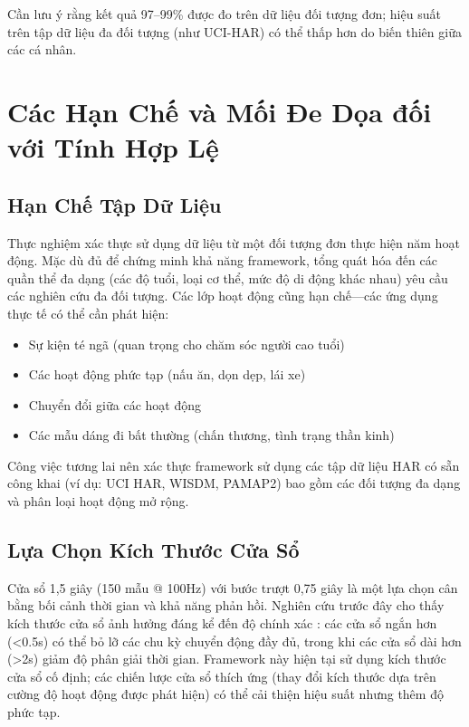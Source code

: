 Cần lưu ý rằng kết quả 97--99\% được đo trên dữ liệu đối tượng đơn; hiệu suất trên tập dữ liệu đa đối tượng (như UCI-HAR) có thể thấp hơn do biến thiên giữa các cá nhân.

\section{Các Hạn Chế và Mối Đe Dọa đối với Tính Hợp Lệ}

\subsection{Hạn Chế Tập Dữ Liệu}
Thực nghiệm xác thực sử dụng dữ liệu từ một đối tượng đơn thực hiện năm hoạt động. Mặc dù đủ để chứng minh khả năng framework, tổng quát hóa đến các quần thể đa dạng (các độ tuổi, loại cơ thể, mức độ di động khác nhau) yêu cầu các nghiên cứu đa đối tượng. Các lớp hoạt động cũng hạn chế—các ứng dụng thực tế có thể cần phát hiện:
\begin{itemize}
    \item Sự kiện té ngã (quan trọng cho chăm sóc người cao tuổi)
    \item Các hoạt động phức tạp (nấu ăn, dọn dẹp, lái xe)
    \item Chuyển đổi giữa các hoạt động
    \item Các mẫu dáng đi bất thường (chấn thương, tình trạng thần kinh)
\end{itemize}

Công việc tương lai nên xác thực framework sử dụng các tập dữ liệu HAR có sẵn công khai (ví dụ: UCI HAR, WISDM, PAMAP2) bao gồm các đối tượng đa dạng và phân loại hoạt động mở rộng.

\subsection{Lựa Chọn Kích Thước Cửa Sổ}
Cửa sổ 1,5 giây (150 mẫu @ 100Hz) với bước trượt 0,75 giây là một lựa chọn cân bằng bối cảnh thời gian và khả năng phản hồi. Nghiên cứu trước đây cho thấy kích thước cửa sổ ảnh hưởng đáng kể đến độ chính xác \cite{banos2014wisdm}: các cửa sổ ngắn hơn (<0.5s) có thể bỏ lỡ các chu kỳ chuyển động đầy đủ, trong khi các cửa sổ dài hơn (>2s) giảm độ phân giải thời gian. Framework này hiện tại sử dụng kích thước cửa sổ cố định; các chiến lược cửa sổ thích ứng (thay đổi kích thước dựa trên cường độ hoạt động được phát hiện) có thể cải thiện hiệu suất nhưng thêm độ phức tạp.

